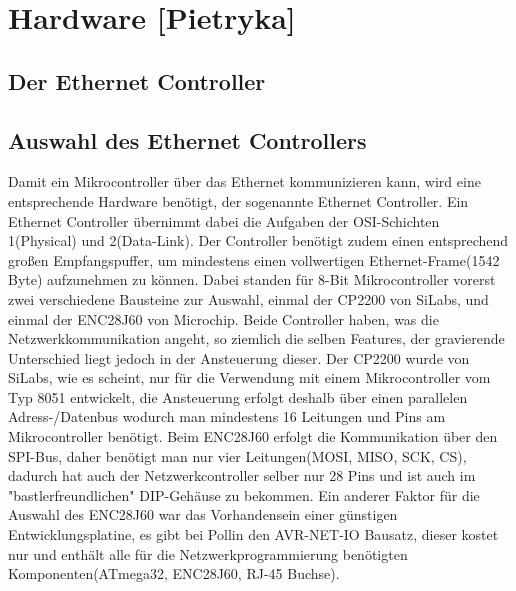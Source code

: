 \documentclass[a4paper,14pt,headsepline]{scrartcl}
\begin{document}
\newpage

\section{Hardware [Pietryka]}
\subsection{Der Ethernet Controller}
\subsection{Auswahl des Ethernet Controllers}
Damit ein Mikrocontroller über das Ethernet kommunizieren kann, wird eine entsprechende Hardware benötigt, der sogenannte Ethernet Controller. Ein Ethernet Controller übernimmt dabei die Aufgaben der OSI-Schichten 1(Physical) und 2(Data-Link). Der Controller benötigt zudem einen entsprechend großen Empfangspuffer, um mindestens einen vollwertigen Ethernet-Frame(1542 Byte) aufzunehmen zu können. Dabei standen für 8-Bit Mikrocontroller vorerst zwei verschiedene Bausteine zur Auswahl, einmal der CP2200 von SiLabs, und einmal der ENC28J60 von Microchip. Beide Controller haben, was die Netzwerkkommunikation angeht, so ziemlich die selben Features, der gravierende Unterschied liegt jedoch in der Ansteuerung dieser. Der CP2200 wurde von SiLabs, wie es scheint, nur für die Verwendung mit einem Mikrocontroller vom Typ 8051 entwickelt, die Ansteuerung erfolgt deshalb über einen parallelen Adress-/Datenbus wodurch man mindestens 16 Leitungen und Pins am Mikrocontroller benötigt. Beim ENC28J60 erfolgt die Kommunikation über den SPI-Bus, daher benötigt man nur vier Leitungen(MOSI, MISO, SCK, CS), dadurch hat auch der Netzwerkcontroller selber nur 28 Pins und ist auch im "bastlerfreundlichen" DIP-Gehäuse zu bekommen. Ein anderer Faktor für die Auswahl des ENC28J60 war das Vorhandensein einer günstigen Entwicklungsplatine, es gibt bei Pollin den AVR-NET-IO Bausatz, dieser kostet nur  und enthält alle für die Netzwerkprogrammierung benötigten Komponenten(ATmega32, ENC28J60, RJ-45 Buchse).
\end{document}
